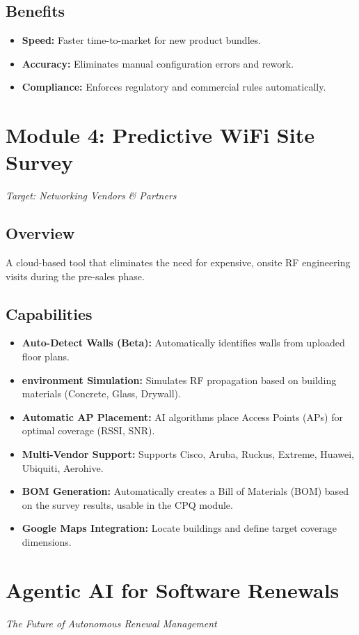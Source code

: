 \documentclass[12pt,a4paper]{article}
\begin{document}
\subsection{Benefits}
\begin{itemize}
    \item \textbf{Speed:} Faster time-to-market for new product bundles.
    \item \textbf{Accuracy:} Eliminates manual configuration errors and rework.
    \item \textbf{Compliance:} Enforces regulatory and commercial rules automatically.
\end{itemize}

\section{Module 4: Predictive WiFi Site Survey}
\textit{Target: Networking Vendors & Partners}

\subsection{Overview}
A cloud-based tool that eliminates the need for expensive, onsite RF engineering visits during the pre-sales phase.

\subsection{Capabilities}
\begin{itemize}
    \item \textbf{Auto-Detect Walls (Beta):} Automatically identifies walls from uploaded floor plans.
    \item \textbf{environment Simulation:} Simulates RF propagation based on building materials (Concrete, Glass, Drywall).
    \item \textbf{Automatic AP Placement:} AI algorithms place Access Points (APs) for optimal coverage (RSSI, SNR).
    \item \textbf{Multi-Vendor Support:} Supports Cisco, Aruba, Ruckus, Extreme, Huawei, Ubiquiti, Aerohive.
    \item \textbf{BOM Generation:} Automatically creates a Bill of Materials (BOM) based on the survey results, usable in the CPQ module.
    \item \textbf{Google Maps Integration:} Locate buildings and define target coverage dimensions.
\end{itemize}

\section{Agentic AI for Software Renewals}
\textit{The Future of Autonomous Renewal Management}
\end{document}
